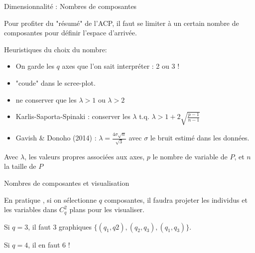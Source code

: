 \documentclass{beamer}
\begin{document}
\begin{frame}{Dimensionnalité : Nombres de composantes}


Pour profiter du "résumé" de l'ACP, il faut se limiter à un certain nombre de composantes pour définir l'espace d'arrivée.

\medskip

Heuristiques du choix du nombre: 
\begin{small}
\begin{itemize}
  \item On garde les $q$ axes que l'on sait \alert{interpréter} : 2 ou 3 !
  \item \alert{"coude"} dans le scree-plot.
  \item ne conserver que les $\lambda > 1$ ou $\lambda > 2$
  \item Karlis-Saporta-Spinaki :  conserver les $\lambda$ t.q. $\lambda > 1 + 2 \sqrt{\frac{p-1}{n-1}}$
  \item Gavish \& Donoho (2014) : $\lambda = \frac{4 \sigma \sqrt{n}}{\sqrt{3}}$ avec $\sigma$ le bruit estimé dans les données.
  \end{itemize}
\end{small}
\begin{tiny}
Avec $\lambda$, les valeurs propres associées aux axes, $p$ le nombre de variable de $P$, et $n$ la taille de $P$
\end{tiny}


\end{frame}







\begin{frame}{Nombres de composantes et visualisation}


En pratique , si on sélectionne $q$ composantes, il faudra projeter les individus et les variables dans $C_q^2$ plans pour les visualiser.

\medskip

Si $q=3$, il faut 3 graphiques  $\{(q_1,q2) , (q_2,q_3), (q_1,q_3)\} $.

Si $q=4$, il en faut 6 !

\end{frame}
\end{document}
